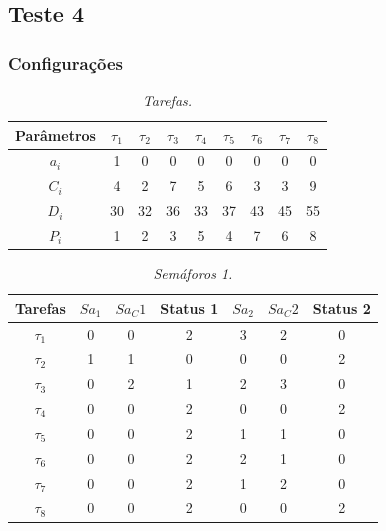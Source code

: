 \subsection{Teste 4}
\subsubsection{Configurações}
\begin{table}[H]
\centering
\caption{\em Tarefas.}
\vspace{0.1cm}
\begin{tabular}{c||c|c|c|c|c|c|c|c}
 
Parâmetros & $\tau_1$ & $\tau_2$ & $\tau_3$ & $\tau_4$ & $\tau_5$ & $\tau_6$ & $\tau_7$ & $\tau_8$\\ 
\hline 
                          
$a_i$ & 1 & 0 & 0 & 0 & 0 & 0 & 0 & 0\\ 
$C_i$ & 4 & 2 & 7 & 5 & 6 & 3 & 3 & 9\\ 
$D_i$ & 30 & 32 & 36 & 33 & 37 & 43 & 45 & 55\\
$P_i$ & 1 & 2 & 3 & 5 & 4 & 7 & 6 & 8
 
\end{tabular}
\end{table}


\begin{table}[H]
\centering
\caption{\em Semáforos 1.}
\vspace{0.1cm}
\begin{tabular}{c||c|c|c||c|c|c}
 
Tarefas & $Sa_1$ & $Sa_C1$ & Status 1 & $Sa_2$ & $Sa_C2$ & Status 2\\ 
\hline 
                          
$\tau_1$ & 0 & 0 & 2 & 3 & 2 & 0\\ 
$\tau_2$ & 1 & 1 & 0 & 0 & 0 & 2\\
$\tau_3$ & 0 & 2 & 1 & 2 & 3 & 0\\
$\tau_4$ & 0 & 0 & 2 & 0 & 0 & 2\\
$\tau_5$ & 0 & 0 & 2 & 1 & 1 & 0\\
$\tau_6$ & 0 & 0 & 2 & 2 & 1 & 0\\
$\tau_7$ & 0 & 0 & 2 & 1 & 2 & 0\\
$\tau_8$ & 0 & 0 & 2 & 0 & 0 & 2

\end{tabular}
\end{table}


